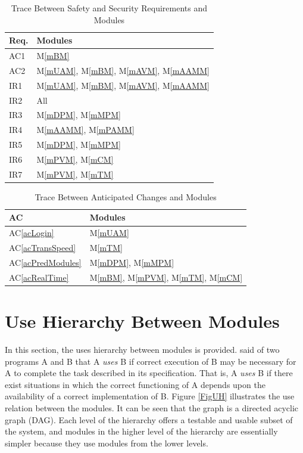 \documentclass[12pt, titlepage]{article}
\newcommand{\acref}[1]{AC\ref{#1}}
\newcommand{\mref}[1]{M\ref{#1}}
\begin{document}
\begin{table}[H]
\centering
\begin{tabular}{p{} p{}}
\toprule
\textbf{Req.} & \textbf{Modules}\\
\midrule
AC1 & \mref{mBM}\\
AC2 & \mref{mUAM}, \mref{mBM}, \mref{mAVM}, \mref{mAAMM}\\
IR1 & \mref{mUAM}, \mref{mBM}, \mref{mAVM}, \mref{mAAMM}\\
IR2 & All \\
IR3 & \mref{mDPM}, \mref{mMPM}\\
IR4 & \mref{mAAMM}, \mref{mPAMM}\\
IR5 & \mref{mDPM}, \mref{mMPM}\\
IR6 & \mref{mPVM}, \mref{mCM}\\
IR7 & \mref{mPVM}, \mref{mTM}\\
\bottomrule
\end{tabular}
\caption{Trace Between Safety and Security Requirements and Modules}
\label{TblRT}
\end{table}

\begin{table}[H]
\centering
\begin{tabular}{p{} p{}}
\toprule
\textbf{AC} & \textbf{Modules}\\
\midrule
\acref{acLogin} & \mref{mUAM}\\
\acref{acTransSpeed} & \mref{mTM}\\
\acref{acPredModules} & \mref{mDPM}, \mref{mMPM}\\
\acref{acRealTime} & \mref{mBM}, \mref{mPVM}, \mref{mTM}, \mref{mCM}\\
\bottomrule
\end{tabular}
\caption{Trace Between Anticipated Changes and Modules}
\label{TblACT}
\end{table}

\section{Use Hierarchy Between Modules} \label{SecUse}

In this section, the uses hierarchy between modules is
provided. \citet{Parnas1978} said of two programs A and B that A {\em uses} B if
correct execution of B may be necessary for A to complete the task described in
its specification. That is, A {\em uses} B if there exist situations in which
the correct functioning of A depends upon the availability of a correct
implementation of B.  Figure \ref{FigUH} illustrates the use relation between
the modules. It can be seen that the graph is a directed acyclic graph
(DAG). Each level of the hierarchy offers a testable and usable subset of the
system, and modules in the higher level of the hierarchy are essentially simpler
because they use modules from the lower levels.
\end{document}
